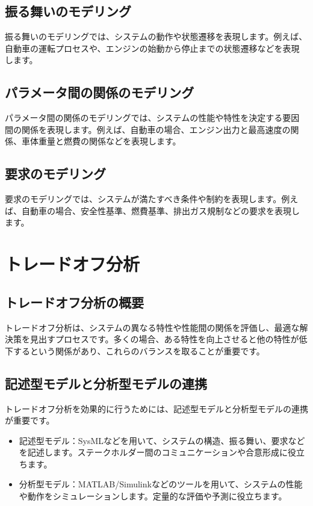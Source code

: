 \subsection{振る舞いのモデリング}

振る舞いのモデリングでは、システムの動作や状態遷移を表現します。例えば、
自動車の運転プロセスや、エンジンの始動から停止までの状態遷移などを表現
します。

\subsection{パラメータ間の関係のモデリング}

パラメータ間の関係のモデリングでは、システムの性能や特性を決定する要因
間の関係を表現します。例えば、自動車の場合、エンジン出力と最高速度の関
係、車体重量と燃費の関係などを表現します。

\subsection{要求のモデリング}

要求のモデリングでは、システムが満たすべき条件や制約を表現します。例え
ば、自動車の場合、安全性基準、燃費基準、排出ガス規制などの要求を表現し
ます。

\section{トレードオフ分析}

\subsection{トレードオフ分析の概要}

トレードオフ分析は、システムの異なる特性や性能間の関係を評価し、最適な解決策を見出すプロセスです。多くの場合、ある特性を向上させると他の特性が低下するという関係があり、これらのバランスを取ることが重要です。

\subsection{記述型モデルと分析型モデルの連携}

トレードオフ分析を効果的に行うためには、記述型モデルと分析型モデルの連携が重要です。

\begin{itemize}
    \item 記述型モデル：SysMLなどを用いて、システムの構造、振る舞い、要求などを記述します。ステークホルダー間のコミュニケーションや合意形成に役立ちます。
    \item 分析型モデル：MATLAB/Simulinkなどのツールを用いて、システムの性能や動作をシミュレーションします。定量的な評価や予測に役立ちます。
\end{itemize}

